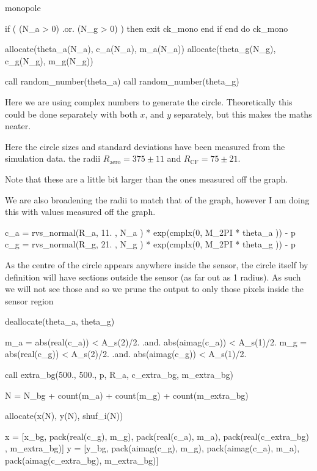 \documentclass[10pt, a4paper]{article}
\begin{document}
\begin{codeblock}{monopole}
\begin{code}
		if ( (N_a > 0) .or. (N_g > 0) ) then 
			exit ck_mono
		end if
	end do ck_mono
	
	allocate(theta_a(N_a), c_a(N_a), m_a(N_a))
	allocate(theta_g(N_g), c_g(N_g), m_g(N_g))
	
	call random_number(theta_a)
	call random_number(theta_g)
\end{code}

Here we are using complex numbers to generate the circle. Theoretically this could be done separately with both $x$, and $y$ separately, but this makes the maths neater. 

Here the circle sizes and standard deviations have been measured from the simulation data. 
the radii $R_\text{aero} = 375\pm11$ and $R_\text{CF} = 75 \pm 21$. 

Note that these are a little bit larger than the ones measured off the graph.


We are also broadening the radii to match that of the graph, however I am doing this with values measured off the graph.

\begin{code}
	c_a = rvs_normal(R_a, 11. , N_a ) * exp(cmplx(0, M_2PI * theta_a )) - p
	c_g = rvs_normal(R_g, 21. , N_g ) * exp(cmplx(0, M_2PI * theta_g )) - p
\end{code}

As the centre of the circle appears anywhere inside the sensor, the circle itself by definition will have sections outside the sensor (as far out as 1 radius). 
As such we will not see those and so we prune the output to only those pixels inside the sensor region 

\begin{code}
	deallocate(theta_a, theta_g)
	
	m_a = abs(real(c_a)) < A_s(2)/2. .and. abs(aimag(c_a)) < A_s(1)/2.
	m_g = abs(real(c_g)) < A_s(2)/2. .and. abs(aimag(c_g)) < A_s(1)/2.
\end{code}

\begin{code}
	call extra_bg(500., 500., p, R_a, c_extra_bg, m_extra_bg)
\end{code}

\begin{code}
	N = N_bg + count(m_a) + count(m_g) + count(m_extra_bg)
	
	allocate(x(N), y(N), shuf_i(N))
	
	x = [x_bg, pack(real(c_g),  m_g),  pack(real(c_a),  m_a), pack(real(c_extra_bg) , m_extra_bg)]
	y = [y_bg, pack(aimag(c_g), m_g),  pack(aimag(c_a), m_a), pack(aimag(c_extra_bg), m_extra_bg)]
	

\end{code}
\end{codeblock}
\end{document}

